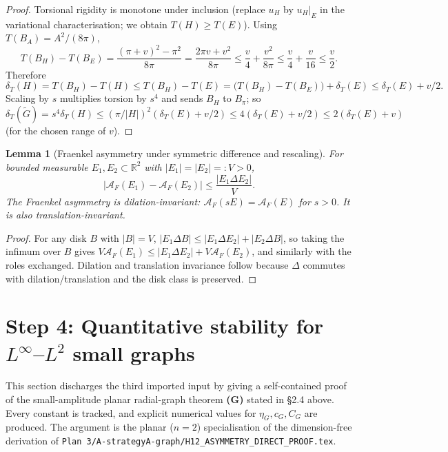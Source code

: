 \documentclass[11pt]{amsart}
\newtheorem{lemma}[theorem]{Lemma}
\newcommand{\R}{\mathbb R}
\newcommand{\dT}{\delta_T}
\newcommand{\AF}{\mathcal A_F}
\newcommand{\Gtil}{\widetilde G}
\begin{document}
\begin{proof}
Torsional rigidity is monotone under inclusion (replace \(u_H\) by
\(u_H|_E\) in the variational characterisation; we obtain
\(T(H)\ge T(E)\)).  Using \(T(B_A)=A^2/(8\pi)\),
\[
   T(B_H)-T(B_E)=\frac{(\pi+v)^2-\pi^2}{8\pi}
      =\frac{2\pi v+v^2}{8\pi}\le\frac{v}{4}+\frac{v^2}{8\pi}
      \le\frac{v}{4}+\frac{v}{16}\le\frac{v}{2}.
\]
Therefore
\[
   \dT(H)=T(B_H)-T(H)\le T(B_H)-T(E)
      =\bigl(T(B_H)-T(B_E)\bigr)+\dT(E)\le\dT(E)+v/2.
\]
Scaling by \(s\) multiplies torsion by \(s^4\) and sends \(B_H\) to
\(B_\pi\); so \(\dT(\Gtil)=s^4\dT(H)\le(\pi/|H|)^2(\dT(E)+v/2)\le
4(\dT(E)+v/2)\le 2(\dT(E)+v)\) (for the chosen range of \(v\)).
\end{proof}

\begin{lemma}[Fraenkel asymmetry under symmetric difference and
rescaling]\label{lem:AF-lip}
For bounded measurable \(E_1,E_2\subset\R^2\) with
\(|E_1|=|E_2|=:V>0\),
\begin{equation}\label{eq:AF-lip}
   |\AF(E_1)-\AF(E_2)|\le\frac{|E_1\Delta E_2|}{V}.
\end{equation}
The Fraenkel asymmetry is dilation-invariant: \(\AF(sE)=\AF(E)\) for
\(s>0\).  It is also translation-invariant.
\end{lemma}

\begin{proof}
For any disk \(B\) with \(|B|=V\), \(|E_1\Delta B|\le|E_1\Delta E_2|
+|E_2\Delta B|\), so taking the infimum over \(B\) gives
\(V\AF(E_1)\le |E_1\Delta E_2|+V\AF(E_2)\), and similarly with the
roles exchanged.  Dilation and translation invariance follow
because \(\Delta\) commutes with dilation/translation and the disk
class is preserved.
\end{proof}

\section{Step 4: Quantitative stability for $L^\infty$--$L^2$ small graphs}\label{sec:step4-Gn}
\label{sec:graph-proof}

This section discharges the third imported input by giving a
self-contained proof of the small-amplitude planar radial-graph
theorem \textbf{(G)} stated in \S2.4 above.  Every constant is
tracked, and explicit numerical values for \(\eta_G,c_G,C_G\) are
produced.
The argument is the planar (\(n=2\)) specialisation of the
dimension-free derivation of
\texttt{Plan~3/A-strategyA-graph/H12\_ASYMMETRY\_DIRECT\_PROOF.tex}.
\end{document}
